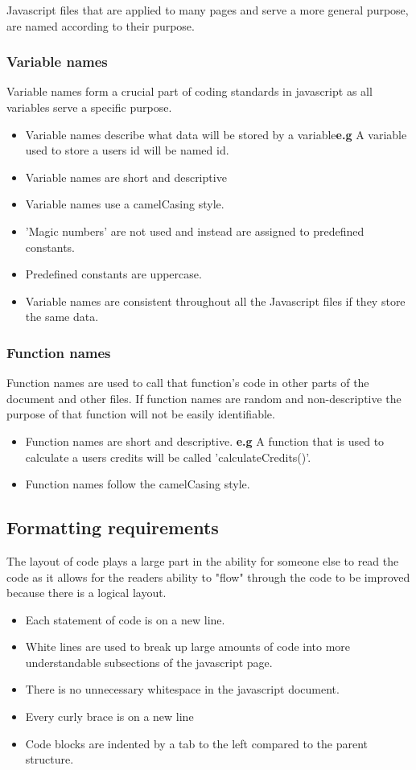 \documentclass[11pt]{article}
\begin{document}
	Javascript files that are applied to many pages and serve a more general purpose, are named according to their purpose.
	\subsubsection{Variable names}
	Variable names form a crucial part of coding standards in javascript as all variables serve a specific purpose.
	\begin{itemize}
		\item Variable names describe what data will be stored by a variable\textbf{e.g} A variable used to store a users id will be named id.
		\item Variable names are short and descriptive
		\item Variable names use a camelCasing style.
		\item 'Magic numbers' are not used and instead are assigned to predefined constants.
		\item Predefined constants are uppercase.
		\item Variable names are consistent throughout all the Javascript files if they store the same data. 
	\end{itemize}
	\subsubsection{Function names}
	Function names are used to call that function's code in other parts of the document and other files. If function names are random and non-descriptive the purpose of that function will not be easily identifiable.
	\begin{itemize}
		\item Function names are short and descriptive. \textbf{e.g} A function that is used to calculate a users credits will be called 'calculateCredits()'.
		\item Function names follow the camelCasing style.
	\end{itemize}
	\subsection{Formatting requirements}
	The layout of code plays a large part in the ability for someone else to read the code as it allows for the readers ability to "flow" through the code to be improved because there is a logical layout.
	\begin{itemize}
		\item Each statement of code is on a new line.
		\item White lines are used to break up large amounts of code into more understandable subsections of the javascript page.
		\item There is no unnecessary whitespace in the javascript document.
		\item Every curly brace is on a new line
		\item Code blocks are indented by a tab to the left compared to the parent structure.
	\end{itemize}
\end{document}
